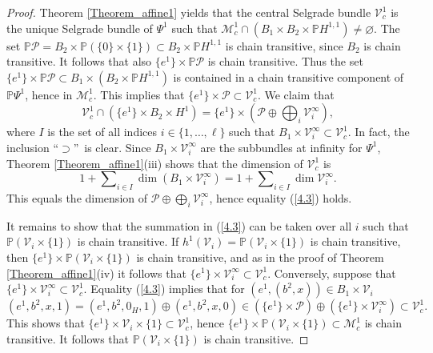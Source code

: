 	\begin{proof}
		Theorem \ref{Theorem_affine1} yields that the central Selgrade bundle
		$\mathcal{V}_{c}^{1}$ is the unique Selgrade bundle of $\Psi^{1}$ such that
		$\mathcal{M}_{c}^{1}\cap\left(  B_{1}\times B_{2}\times\mathbb{P}%
		H^{1,1}\right)  \not =\varnothing$. The set $\mathbb{P}\mathcal{P}=B_{2}%
		\times\mathbb{P}\left(  \{0\}\times\{1\}\right)  \subset B_{2}\times
		\mathbb{P}H^{1,1}$ is chain transitive, since $B_{2}$ is chain transitive. It
		follows that also $\{e^{1}\}\times\mathbb{P}\mathcal{P}$ is chain transitive.
		Thus the set $\{e^{1}\}\times\mathbb{P}\mathcal{P}\subset B_{1}\times\left(
		B_{2}\times\mathbb{P}H^{1,1}\right)  $ is contained in a chain transitive
		component of $\mathbb{P}\Psi^{1}$, hence in $\mathcal{M}_{c}^{1}$. This
		implies that $\{e^{1}\}\times\mathcal{P}\subset\mathcal{V}_{c}^{1}$. We claim
		that
		\begin{equation}
			\mathcal{V}_{c}^{1}\cap\left(  \{e^{1}\}\times B_{2}\times H^{1}\right)
			=\{e^{1}\}\times\left(  \mathcal{P}\oplus\bigoplus\nolimits_{i}\mathcal{V}%
			_{i}^{\infty}\right)  , \label{4.3}%
		\end{equation}
		where $I$ is the set of all indices $i\in\{1,\ldots,\ell\}$ such that
		$B_{1}\times\mathcal{V}_{i}^{\infty}\subset\mathcal{V}_{c}^{1}$. In fact, the
		inclusion \textquotedblleft$\supset$\textquotedblright\ is clear. Since
		$B_{1}\times\mathcal{V}_{i}^{\infty}$ are the subbundles at infinity for
		$\Psi^{1}$, Theorem \ref{Theorem_affine1}(iii) shows that the dimension of
		$\mathcal{V}_{c}^{1}$ is
		\[
		1+\sum\nolimits_{i\in I}\dim\left(  B_{1}\times\mathcal{V}_{i}^{\infty
		}\right)  =1+\sum\nolimits_{i\in I}\dim\mathcal{V}_{i}^{\infty}.
		\]
		This equals the dimension of $\mathcal{P}\oplus\bigoplus\nolimits_{i}%
		\mathcal{V}_{i}^{\infty}$, hence equality (\ref{4.3}) holds.
		
		It remains to show that the summation in (\ref{4.3}) can be taken over all $i$
		such that $\mathbb{P}(\mathcal{V}_{i}\times\{1\})$ is chain transitive. If
		$h^{1}(\mathcal{V}_{i})=\mathbb{P}\left(  \mathcal{V}_{i}\times\{1\}\right)  $
		is chain transitive, then $\{e^{1}\}\times\mathbb{P}\left(  \mathcal{V}%
		_{i}\times\{1\}\right)  $ is chain transitive, and as in the proof of Theorem
		\ref{Theorem_affine1}(iv) it follows that $\{e^{1}\}\times\mathcal{V}%
		_{i}^{\infty}\subset\mathcal{V}_{c}^{1}$. Conversely, suppose that
		$\{e^{1}\}\times\mathcal{V}_{i}^{\infty}\subset\mathcal{V}_{c}^{1}$. Equality
		(\ref{4.3}) implies that for $(e^{1},(b^{2},x))\in B_{1}\times\mathcal{V}%
		_{i}$
		\[
		(e^{1},b^{2},x,1)=(e^{1},b^{2},0_{H},1)\oplus(e^{1},b^{2},x,0)\in\left(
		\{e^{1}\}\times\mathcal{P}\right)  \oplus\left(  \{e^{1}\}\times
		\mathcal{V}_{i}^{\infty}\right)  \subset\mathcal{V}_{c}^{1}\mbox{.}
		\]
		This shows that $\{e^{1}\}\times\mathcal{V}_{i}\times\{1\}\subset
		\mathcal{V}_{c}^{1}$, hence $\{e^{1}\}\times\mathbb{P}\left(  \mathcal{V}%
		_{i}\times\{1\}\right)  \subset\mathcal{M}_{c}^{1}$ is chain transitive. It
		follows that $\mathbb{P}\left(  \mathcal{V}_{i}\times\{1\}\right)  $ is chain transitive.
	\end{proof}
	

